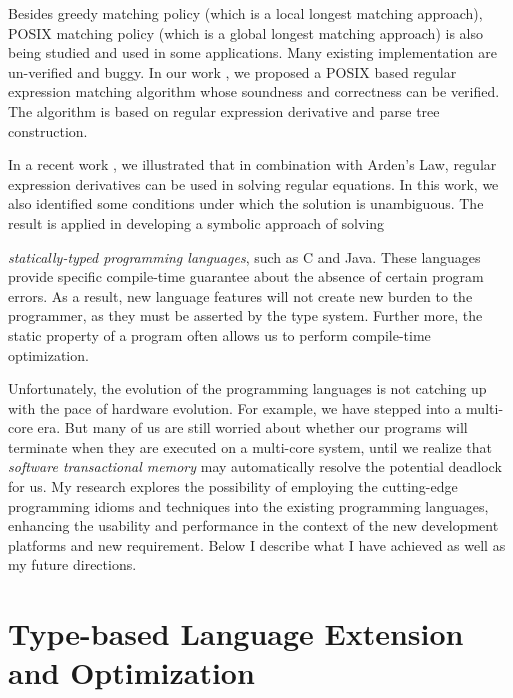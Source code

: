 \documentclass[12pt]{article}
\theoremstyle{plain} \numberwithin{equation}{section}
\theoremstyle{definition}
\newcommand{\kl}[1]{}
\begin{document}
Besides greedy matching policy (which is a local longest matching approach),
POSIX matching policy (which is a global longest matching approach) is also being studied
and used in some applications. Many existing implementation are un-verified and buggy.
In our work \cite{DBLP:conf/flops/SulzmannL14}, we proposed
a POSIX based regular expression matching algorithm whose soundness and correctness can be
verified. The algorithm is based on regular expression derivative and parse tree construction.

In a recent work \cite{DBLP:journals/corr/abs-1908-03710}, we
illustrated that in combination with Arden's Law, regular expression derivatives can be used in solving
regular equations. In this work, we also identified some conditions
under which the solution is unambiguous. The result is applied in
developing a symbolic approach of solving 




\kl{debugging}



\kl{rewriting frontier}

{\em statically-typed
programming languages}, such as C and Java. These languages
provide specific compile-time guarantee about the absence of certain
program errors. As a result, new language features will not create new
burden to the programmer, as they must be asserted by the type system.
Further more, the static property of a program often allows us 
to perform compile-time optimization. 

\kl{What is the problem?}
Unfortunately, the evolution of the programming languages 
is not catching up with the pace of hardware evolution.
For example, we have stepped into a multi-core era.
But many of us are still worried about whether our programs will terminate when they are executed on a multi-core system, until we realize
that {\em software transactional memory} \cite{stm} may automatically 
resolve the potential deadlock for us. 
My research explores the possibility of employing the cutting-edge
programming idioms and techniques into the existing 
programming languages, enhancing the usability and performance
in the context of the new development platforms and new requirement. 
Below I describe what I have achieved as well as my future directions.


\section{Type-based Language Extension and Optimization}
\end{document}
